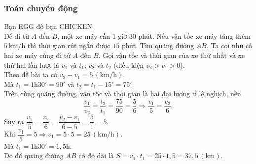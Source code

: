 \subsubsection{Toán chuyển động}
\begin{bt}%
Bạn EGG đố bạn CHICKEN\\
Để đi  từ $A$ đến $B$, một xe máy cần $1$ giờ $30$ phút. Nếu vận tốc xe máy tăng thêm $5\, \mathrm{km}/\mathrm{h}$ thì thời gian rút ngắn được $15$ phút. Tìm quãng đường $AB$.
	\loigiai
	{Ta coi như có hai xe máy cùng đi từ $A$ đến $B$. Gọi vận tốc và thời gian của xe thứ nhất và xe thứ hai lần lượt là $v_{1}$ và $t_{1}$; $v_{2}$ và $t_{2}$ (điều kiện $v_{2} > v_{1} > 0$).\\
	Theo đề bài ta có  $v_{2} - v_{1} = 5\, \left(\mathrm{km}/\mathrm{h}\right)$.\\
	Mà $t_{1} = 1\mathrm{h}30' = 90'$ và  $t_{2} = t_{1} - 15' = 75'$.\\
	Trên cùng quãng đường, vận tốc và thời gian là hai đại lượng tỉ lệ nghịch, nên 
	$$\dfrac{v_{1}}{v_{2}} = \dfrac{t_{2}}{t_{1}} = \dfrac{75}{90} = \dfrac{5}{6}\Rightarrow \dfrac{v_{1}}{5} = \dfrac{v_{2}}{6}.$$  
Suy ra 	$\dfrac{v_{1}}{5} = \dfrac{v_{2}}{6} = \dfrac{v_{2} - v_{1}}{6 - 5} = \dfrac{5}{1} = 5$.\\
Khi $\dfrac{v_{1}}{5} = 5 \Rightarrow v_{1} = 5\cdot 5 = 25\, \left(\mathrm{km}/\mathrm{h}\right)$.\\
Mà $t_{1} = 1\mathrm{h}30' = 1{,}5 \mathrm{h}$.\\
Do đó quãng đường $AB$ có độ dài là $S = v_{1}\cdot t_{1} = 25\cdot 1{,}5 = 37{,}5\, \left(\mathrm{km}\right)$.
}		
\end{bt}


